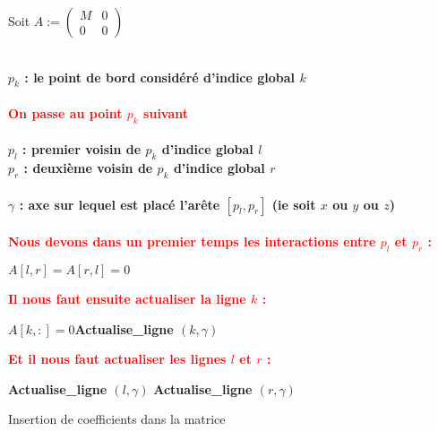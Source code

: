 \documentclass[11pt,a4paper]{article}
\begin{document}
\begin{algorithm}[H]
\SetAlgoLined
Soit $A:=\left(\begin{array}{c|c}
M & 0\\
\hline
0 & 0
\end{array}\right)$\\
~\\
{
	\textbf{$p_k$ : le point de bord considéré d'indice global $k$}\\
	~\\
	{	
		\textcolor{red}{\textbf{On passe au point $p_k$ suivant}}\\
	}
	~\\
	\textbf{$p_l$ : premier voisin de $p_k$ d'indice global $l$}\\
	\textbf{$p_r$ : deuxième voisin de $p_k$ d'indice global $r$}\\
	~\\
	\textbf{$\gamma$ : axe sur lequel est placé l'arête $[p_l,p_r]$ (ie soit $x$ ou $y$ ou $z$)}\\
	~\\
	\textcolor{red}{\textbf{Nous devons dans un premier temps les interactions entre $p_l$ et $p_r$ :}}
	\begin{center}
	$A [l, r] = A [r, l] = 0$
	\end{center}
	\textcolor{red}{\textbf{Il nous faut ensuite actualiser la ligne $k$ :}}
	\begin{center}
	$A [k, :] = 0$\hspace{1cm}\textbf{Actualise\_ligne $(k, \gamma)$}
	\end{center}
	\textcolor{red}{\textbf{Et il nous faut actualiser les lignes $l$ et $r$ :}}
	\begin{center}
	\textbf{Actualise\_ligne $(l, \gamma)$}\hspace{1cm}
	\textbf{Actualise\_ligne $(r, \gamma)$}
	\end{center}
}
\caption{Insertion de coefficients dans la matrice}
\end{algorithm}
\end{document}
